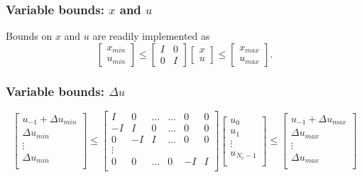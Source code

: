 \documentclass[a4paper,12pt,fleqn]{book}
\newcommand{\Nc}{{N_c}}
\begin{document}
\subsubsection{Variable bounds: $x$ and $u$}
Bounds on $x$ and $u$ are readily implemented as
\begin{equation}
\begin{bmatrix}
 x_{min}\\u_{min}
\end{bmatrix}
\leq
\begin{bmatrix}
 I &0\\
 0 & I
\end{bmatrix}
\begin{bmatrix}
 x\\u
\end{bmatrix}
\leq
\begin{bmatrix}
 x_{max}\\u_{max}
\end{bmatrix}.
\end{equation}
\subsubsection{Variable bounds: $\Delta u$}
\begin{equation}
\begin{bmatrix}
u_{-1} +\Delta u_{min}\\
\Delta u_{min}\\
\vdots\\
\Delta u_{min}\\
\end{bmatrix} \leq 
\begin{bmatrix}
  I  &  0 & \dots & \dots  & 0 & 0\\
 -I  &  I &  0    & \dots  & 0 & 0\\
  0  & -I &  I    & \dots  & 0 & 0\\
	\vdots\\
	0  &  0 & \dots & 0      &-I & I\\    
\end{bmatrix}
\begin{bmatrix}
u_0\\
u_1\\
\vdots\\
u_{\Nc-1}\\
\end{bmatrix}
\leq 
\begin{bmatrix}
u_{-1} +\Delta u_{max}\\
\Delta u_{max}\\
\vdots\\
\Delta u_{max}\\
\end{bmatrix}
\end{equation}
\end{document}
